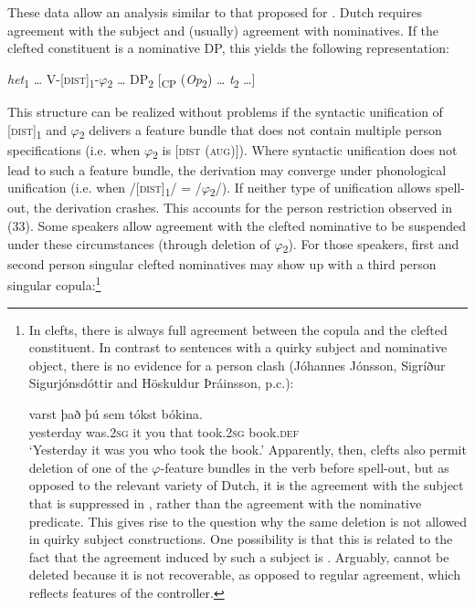 \documentclass[output=paper]{langsci/langscibook}
\begin{document}
These data allow an analysis similar to that proposed for . Dutch requires agreement with the subject and (usually) agreement with nominatives. If the clefted constituent is a nominative DP, this yields the following representation: 

\ea 
 \textit{het}\textsubscript{1} … V-[\textsc{dist}]\textsubscript{1}{}-$\varphi $\textsubscript{2} … DP\textsubscript{2} [\textsubscript{CP} (\textit{Op}\textsubscript{2}) … \textit{t}\textsubscript{2} …]
\z

This structure can be realized without problems if the syntactic unification of [\textsc{dist}]\textsubscript{1} and $\varphi $\textsubscript{2} delivers a feature bundle that does not contain multiple person specifications (i.e. when $\varphi $\textsubscript{2} is [\textsc{dist} (\textsc{aug})]). Where syntactic unification does not lead to such a feature bundle, the derivation may converge under phonological unification (i.e. when /[\textsc{dist}]\textsubscript{1}/ = /$\varphi $\textsubscript{2}/). If neither type of unification allows spell-out, the derivation crashes. This accounts for the person restriction observed in (33). Some speakers allow agreement with the clefted nominative to be suspended under these circumstances (through deletion of $\varphi $\textsubscript{2}). For those speakers, first and second person singular clefted nominatives may show up with a third person singular copula:\footnote{In  clefts, there is always full agreement between the copula and the clefted constituent. In contrast to sentences with a quirky subject and nominative object, there is no evidence for a person clash (Jóhannes Jónsson, Sigríður Sigurjónsdóttir and Höskuldur Þráinsson, p.c.):

\ea {}        varst       það þú   sem tókst       bókina. \\
         yesterday was.\textsc{2sg} it     you that took.\textsc{2sg} book.\textsc{def}\\
    \glt ‘Yesterday it was you who took the book.’
\z Apparently, then,  clefts also permit deletion of one of the $\varphi $-feature bundles in the verb before spell-out, but as opposed to the relevant variety of Dutch, it is the agreement with the subject that is suppressed in , rather than the agreement with the nominative predicate. This gives rise to the question why the same deletion is not allowed in quirky subject constructions. One possibility is that this is related to the fact that the agreement induced by such a subject is . Arguably,  cannot be deleted because it is not recoverable, as opposed to regular agreement, which reflects features of the controller.}
\end{document}
